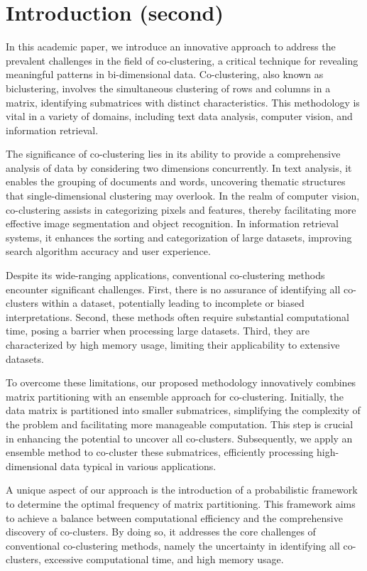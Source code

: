 \section{Introduction (second)}

In this academic paper, we introduce an innovative approach to address the prevalent challenges in the field of co-clustering, a critical technique for revealing meaningful patterns in bi-dimensional data. Co-clustering, also known as biclustering, involves the simultaneous clustering of rows and columns in a matrix, identifying submatrices with distinct characteristics. This methodology is vital in a variety of domains, including text data analysis, computer vision, and information retrieval.

The significance of co-clustering lies in its ability to provide a comprehensive analysis of data by considering two dimensions concurrently. In text analysis, it enables the grouping of documents and words, uncovering thematic structures that single-dimensional clustering may overlook. In the realm of computer vision, co-clustering assists in categorizing pixels and features, thereby facilitating more effective image segmentation and object recognition. In information retrieval systems, it enhances the sorting and categorization of large datasets, improving search algorithm accuracy and user experience.

Despite its wide-ranging applications, conventional co-clustering methods encounter significant challenges. First, there is no assurance of identifying all co-clusters within a dataset, potentially leading to incomplete or biased interpretations. Second, these methods often require substantial computational time, posing a barrier when processing large datasets. Third, they are characterized by high memory usage, limiting their applicability to extensive datasets.

To overcome these limitations, our proposed methodology innovatively combines matrix partitioning with an ensemble approach for co-clustering. Initially, the data matrix is partitioned into smaller submatrices, simplifying the complexity of the problem and facilitating more manageable computation. This step is crucial in enhancing the potential to uncover all co-clusters. Subsequently, we apply an ensemble method to co-cluster these submatrices, efficiently processing high-dimensional data typical in various applications.

A unique aspect of our approach is the introduction of a probabilistic framework to determine the optimal frequency of matrix partitioning. This framework aims to achieve a balance between computational efficiency and the comprehensive discovery of co-clusters. By doing so, it addresses the core challenges of conventional co-clustering methods, namely the uncertainty in identifying all co-clusters, excessive computational time, and high memory usage.

